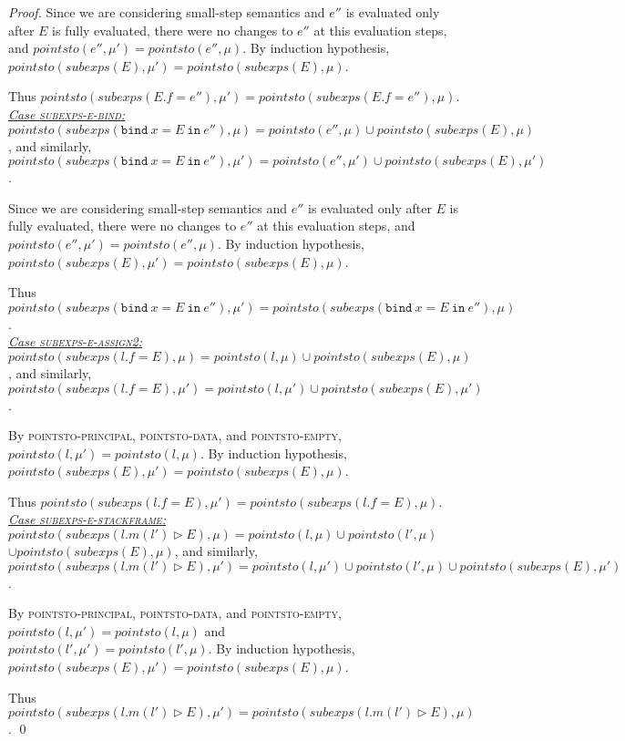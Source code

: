 \documentclass{llncs}
\newcommand{\keywadj}[1]{\mathtt{#1}}
\newcommand{\keyw}[1]{\keywadj{#1}~}
\begin{document}
\begin{proof}
Since we are considering small-step semantics and $e''$ is evaluated only after $E$ is fully evaluated, there were no changes to $e''$ at this evaluation steps, and $pointsto(e'', \mu') = pointsto(e'', \mu)$. By induction hypothesis, $pointsto(subexps(E), \mu') = pointsto(subexps(E), \mu)$.

Thus $pointsto(subexps(E.f = e''), \mu') =pointsto(subexps(E.f = e''), \mu)$.\\

\noindent\underline{\textit{Case \textsc{subexps-e-bind}:}} $pointsto(subexps(\keyw{bind} x = E~\keyw{in} e''), \mu) = pointsto(e'', \mu) \cup pointsto(subexps(E), \mu)$, and similarly, $pointsto(subexps(\keyw{bind} x = E~\keyw{in} e''), \mu') = pointsto(e'', \mu') \cup pointsto(subexps(E), \mu')$.

Since we are considering small-step semantics and $e''$ is evaluated only after $E$ is fully evaluated, there were no changes to $e''$ at this evaluation steps, and $pointsto(e'', \mu') = pointsto(e'', \mu)$. By induction hypothesis, $pointsto(subexps(E), \mu') = pointsto(subexps(E), \mu)$.

Thus $pointsto(subexps(\keyw{bind} x = E~\keyw{in} e''), \mu') =pointsto(subexps(\keyw{bind} x = E~\keyw{in} e''), \mu)$.\\

\noindent\underline{\textit{Case \textsc{subexps-e-assign2}:}} $pointsto(subexps(l.f = E), \mu) = pointsto(l, \mu) \cup pointsto(subexps(E), \mu)$, and similarly, $pointsto(subexps(l.f = E), \mu') = pointsto(l, \mu') \cup pointsto(subexps(E), \mu')$.

By \textsc{pointsto-principal}, \textsc{pointsto-data}, and \textsc{pointsto-empty}, $pointsto(l, \mu') = pointsto(l, \mu)$. By induction hypothesis, $pointsto(subexps(E), \mu') = pointsto(subexps(E), \mu)$.

Thus $pointsto(subexps(l.f = E), \mu') =pointsto(subexps(l.f = E), \mu)$.\\

\noindent\underline{\textit{Case \textsc{subexps-e-stackframe}:}} $pointsto(subexps(l.m(l') \rhd E), \mu) = pointsto(l, \mu) \cup pointsto(l', \mu)$\\
$\cup pointsto(subexps(E), \mu)$, and similarly, $pointsto(subexps(l.m(l') \rhd E), \mu') = pointsto(l, \mu') \cup pointsto(l', \mu) \cup pointsto(subexps(E), \mu')$.

By \textsc{pointsto-principal}, \textsc{pointsto-data}, and \textsc{pointsto-empty}, $pointsto(l, \mu') = pointsto(l, \mu)$ and\\
$pointsto(l', \mu') = pointsto(l', \mu)$. By induction hypothesis, $pointsto(subexps(E), \mu') = pointsto(subexps(E), \mu)$.

Thus $pointsto(subexps(l.m(l') \rhd E), \mu') =pointsto(subexps(l.m(l') \rhd E), \mu)$.
\qed
\end{proof}
\end{document}
